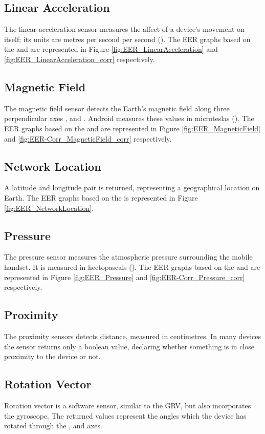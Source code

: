 \documentclass{article}
\begin{document}
\subsection{Linear Acceleration}
The linear acceleration sensor measures the affect of a device's movement on itself; its units are metres per second per second (). The EER graphs based on the  and  are represented in Figure \ref{fig:EER_LinearAcceleration} and \ref{fig:EER_LinearAcceleration_corr} respectively.

\subsection{Magnetic Field}
The magnetic field sensor detects the Earth's magnetic field along three perpendicular axes ,  and .  Android measures these values in microteslas ().  The EER graphs based on the  and  are represented in Figure \ref{fig:EER_MagneticField} and \ref{fig:EER-Corr_MagneticField_corr} respectively.  

\subsection{Network Location}
A latitude and longitude pair is returned, representing a geographical location on Earth.  The EER graphs based on the  is represented in Figure \ref{fig:EER_NetworkLocation}.

\subsection{Pressure}
The pressure sensor measures the atmospheric pressure surrounding the mobile handset. It is measured in hectopascals ().
The EER graphs based on the  and  are represented in Figure \ref{fig:EER_Pressure} and \ref{fig:EER-Corr_Pressure_corr} respectively.

\subsection{Proximity}
The proximity sensors detects distance, measured in centimetres.
In many devices the sensor returns only a boolean value, declaring whether something is in close proximity to the device or not.


\subsection{Rotation Vector}
Rotation vector is a software sensor, similar to the GRV, but also incorporates the gyroscope. The returned values represent the angles which the device has rotated through the ,  and  axes.
\end{document}
